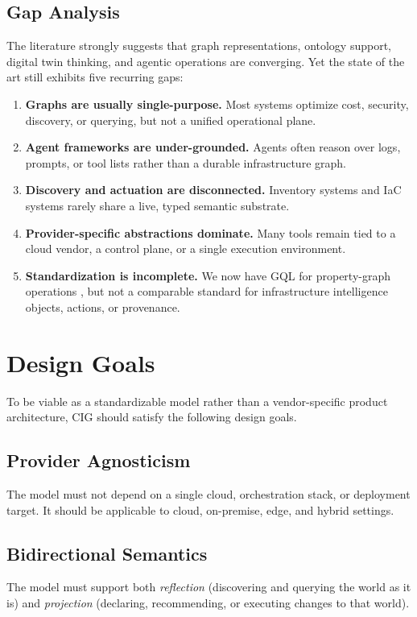 \documentclass[conference]{IEEEtran}
\begin{document}
\subsection{Gap Analysis}
The literature strongly suggests that graph representations, ontology support, digital twin thinking, and agentic operations are converging. Yet the state of the art still exhibits five recurring gaps:
\begin{enumerate}
    \item \textbf{Graphs are usually single-purpose.} Most systems optimize cost, security, discovery, or querying, but not a unified operational plane.
    \item \textbf{Agent frameworks are under-grounded.} Agents often reason over logs, prompts, or tool lists rather than a durable infrastructure graph.
    \item \textbf{Discovery and actuation are disconnected.} Inventory systems and IaC systems rarely share a live, typed semantic substrate.
    \item \textbf{Provider-specific abstractions dominate.} Many tools remain tied to a cloud vendor, a control plane, or a single execution environment.
    \item \textbf{Standardization is incomplete.} We now have GQL for property-graph operations \cite{iso2024gql}, but not a comparable standard for infrastructure intelligence objects, actions, or provenance.
\end{enumerate}

\section{Design Goals}
To be viable as a standardizable model rather than a vendor-specific product architecture, CIG should satisfy the following design goals.

\subsection{Provider Agnosticism}
The model must not depend on a single cloud, orchestration stack, or deployment target. It should be applicable to cloud, on-premise, edge, and hybrid settings.

\subsection{Bidirectional Semantics}
The model must support both \emph{reflection} (discovering and querying the world as it is) and \emph{projection} (declaring, recommending, or executing changes to that world).
\end{document}
